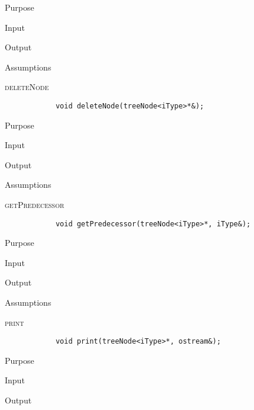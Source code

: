 \documentclass[pdftex, 12pt]{article}
\begin{document}
\begin{description}
\begin{description}
			\item{Purpose}

			\item{Input}

			\item{Output}

			\item{Assumptions}

		\end{description}
	\item{\textsc{deleteNode}}
		\begin{lstlisting}
			void deleteNode(treeNode<iType>*&);
		\end{lstlisting}
		\begin{description}

			\item{Purpose}

			\item{Input}

			\item{Output}

			\item{Assumptions}

		\end{description}
	\item{\textsc{getPredecessor}}
		\begin{lstlisting}
			void getPredecessor(treeNode<iType>*, iType&);
		\end{lstlisting}
		\begin{description}

			\item{Purpose}

			\item{Input}

			\item{Output}

			\item{Assumptions}

		\end{description}
	\item{\textsc{print}}
		\begin{lstlisting}
			void print(treeNode<iType>*, ostream&);
		\end{lstlisting}
		\begin{description}

			\item{Purpose}

			\item{Input}

			\item{Output}


\end{description}
\end{description}
\end{document}
